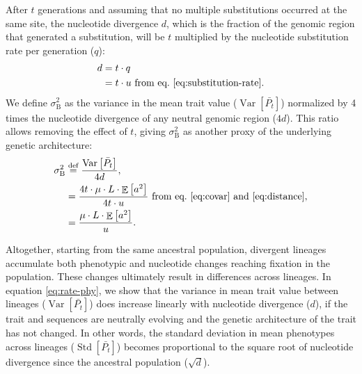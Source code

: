\documentclass{article}
\newcommand{\defEqual}{\stackrel{\text{def}}{=}}
\newcommand{\Multiply}{\cdot}
\DeclareMathOperator{\E}{\mathbb{E}}
\DeclareMathOperator{\Var}{\text{Var}}
\DeclareMathOperator{\Std}{\text{Std}}
\newcommand{\Time}{t}
\newcommand{\Trait}{P}
\newcommand{\MeanTrait}{\bar{\Trait_{\Time}}}
\newcommand{\VarPhy}{\Var \left[\MeanTrait\right]}
\newcommand{\StdPhy}{\Std \left[\MeanTrait\right]}
\newcommand{\MutationRatePheno}{\mu}
\newcommand{\MutationRateNuc}{u}
\newcommand{\SubRate}{q}
\newcommand{\NbrLoci}{L}
\newcommand{\GenArchi}{\NbrLoci \Multiply \E \left[ a^2 \right]}
\newcommand{\RateBetween}{\sigma^2_{\mathrm{B}}}
\begin{document}
After $\Time$ generations and assuming that no multiple substitutions occurred at the same site, the nucleotide divergence $d$, which is the fraction of the genomic region that generated a substitution, will be $\Time$ multiplied by the nucleotide substitution rate per generation ($\SubRate$):
\begin{align}
    d & = \Time \Multiply \SubRate \\
    & = \Time \Multiply \MutationRateNuc \text{ from eq.~\ref{eq:substitution-rate}}. \label{eq:distance}
\end{align}
We define $\RateBetween$ as the variance in the mean trait value ($\VarPhy$) normalized by 4 times the nucleotide divergence of any neutral genomic region ($4d$).
This ratio allows removing the effect of $\Time$, giving $\RateBetween$ as another proxy of the underlying genetic architecture:
\begin{align}
    \RateBetween & \defEqual \frac{\VarPhy}{4 d} \label{eq:def-rate-phy},\\
    & = \frac{4 \Time \Multiply \MutationRatePheno \Multiply \GenArchi}{4 \Time \Multiply \MutationRateNuc}\text{ from eq.~\ref{eq:covar} and~\ref{eq:distance}}, \\
    & = \frac{\MutationRatePheno \Multiply \GenArchi}{\MutationRateNuc} \label{eq:rate-phy}.
\end{align}

Altogether, starting from the same ancestral population, divergent lineages accumulate both phenotypic and nucleotide changes reaching fixation in the population.
These changes ultimately result in differences across lineages.
In equation \ref{eq:rate-phy}, we show that the variance in mean trait value between lineages ($\VarPhy$) does increase linearly with nucleotide divergence ($d$), if the trait and sequences are neutrally evolving and the genetic architecture of the trait has not changed.
In other words, the standard deviation in mean phenotypes across lineages ($\StdPhy$) becomes proportional to the square root of nucleotide divergence since the ancestral population ($\sqrt{d}$).
\end{document}
